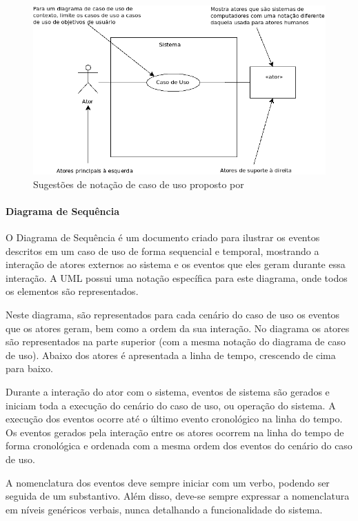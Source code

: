 \begin{figure}
	\centering
	\includegraphics[scale=0.75]{images/exemplo-uml.png}
	\caption{Sugestões de notação de caso de uso proposto por ~\cite{larman08}}
	\label{fig:diagrama-uml}
\end{figure}

\paragraph{Diagrama de Sequência}
O Diagrama de Sequência é um documento criado para ilustrar os eventos descritos em um caso de uso de forma sequencial e temporal, mostrando a interação de atores externos ao sistema e os eventos que eles geram durante essa interação. A UML possui uma notação específica para este diagrama, onde todos os elementos são representados.

Neste diagrama, são representados para cada cenário do caso de uso os eventos que os atores geram, bem como a ordem da sua interação. No diagrama os atores são representados na parte superior (com a mesma notação do diagrama de caso de uso). Abaixo dos atores é apresentada a linha de tempo, crescendo de cima para baixo. 

Durante a interação do ator com o sistema, eventos de sistema são gerados e iniciam toda a execução do cenário do caso de uso, ou operação do sistema. A execução dos eventos ocorre até o último evento cronológico na linha do tempo. Os eventos gerados pela interação entre os atores ocorrem na linha do tempo de forma cronológica e ordenada com a mesma ordem dos eventos do cenário do caso de uso.

A nomenclatura dos eventos deve sempre iniciar com um verbo, podendo ser seguida de um substantivo. Além disso, deve-se sempre expressar a nomenclatura em níveis genéricos verbais, nunca detalhando a funcionalidade do sistema.

